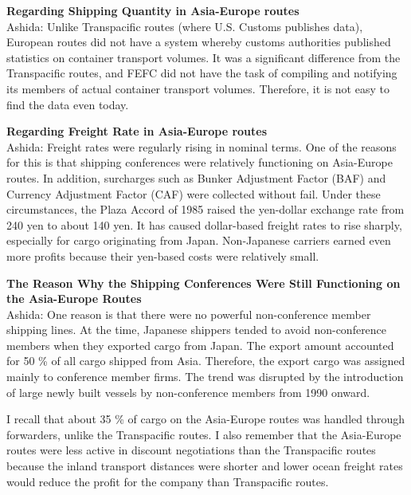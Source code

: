 \documentclass[11pt]{article}
\begin{document}

\textbf{Regarding Shipping Quantity in Asia-Europe routes} \\
Ashida: Unlike Transpacific routes (where U.S. Customs publishes data), European routes did not have a system whereby customs authorities published statistics on container transport volumes. It was a significant difference from the Transpacific routes, and FEFC did not have the task of compiling and notifying its members of actual container transport volumes. Therefore, it is not easy to find the data even today. %

\textbf{Regarding Freight Rate in Asia-Europe routes} \\
Ashida: Freight rates were regularly rising in nominal terms. One of the reasons for this is that shipping conferences were relatively functioning on Asia-Europe routes. In addition, surcharges such as Bunker Adjustment Factor (BAF) and Currency Adjustment Factor (CAF) were collected without fail. Under these circumstances, the Plaza Accord of 1985 raised the yen-dollar exchange rate from 240 yen to about 140 yen. It has caused dollar-based freight rates to rise sharply, especially for cargo originating from Japan. Non-Japanese carriers earned even more profits because their yen-based costs were relatively small.  %

\textbf{The Reason Why the Shipping Conferences Were Still Functioning on the Asia-Europe Routes}\\
Ashida: One reason is that there were no powerful non-conference member shipping lines. At the time, Japanese shippers tended to avoid non-conference members when they exported cargo from Japan. The export amount accounted for 50 \% of all cargo shipped from Asia. Therefore, the export cargo was assigned mainly to conference member firms. The trend was disrupted by the introduction of large newly built vessels by non-conference members from 1990 onward.

I recall that about 35 \% of cargo on the Asia-Europe routes was handled through forwarders, unlike the Transpacific routes. I also remember that the Asia-Europe routes were less active in discount negotiations than the Transpacific routes because the inland transport distances were shorter and lower ocean freight rates would reduce the profit for the company than Transpacific routes. %
\end{document}
